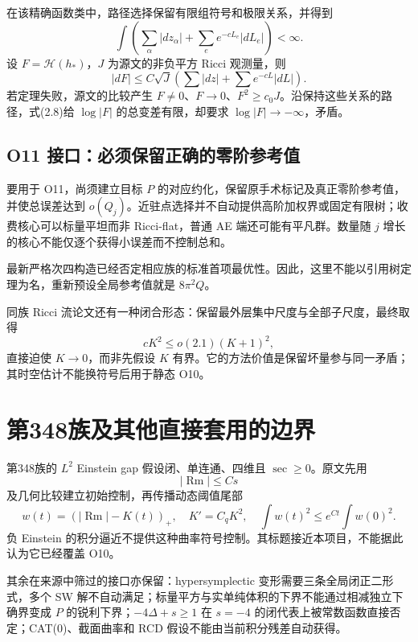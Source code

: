 \documentclass[UTF8,11pt,openany,fontset=none]{ctexbook}
\theoremstyle{definition}
\theoremstyle{remark}
\begin{document}
在该精确函数类中，路径选择保留有限组符号和极限关系，并得到 \[
 \int\left(\sum_\alpha|dz_\alpha|+
 \sum_e e^{-cL_e}|dL_e|\right)<\infty.
\tag{2.7}
\] 设 \(F=\mathscr H(h_*)\)，\(J\) 为源文的非负平方 Ricci 观测量，则 \[
 |dF|\le C\sqrt J\left(\sum|dz|+\sum e^{-cL}|dL|\right).
\tag{2.8}
\] 若定理失败，源文的比较产生 \(F\ne0\)、\(F\to0\)、\(F^2\ge c_0J\)。沿保持这些关系的路径，式(2.8)给 \(\log|F|\) 的总变差有限，却要求 \(\log|F|\to-\infty\)，矛盾。

\subsection{O11 接口：必须保留正确的零阶参考值}\label{v2-o11-ux63a5ux53e3ux5fc5ux987bux4fddux7559ux6b63ux786eux7684ux96f6ux9636ux53c2ux8003ux503c}

要用于 O11，尚须建立目标 \(P\) 的对应约化，保留原手术标记及真正零阶参考值，并使总误差达到 \(o(Q_j)\)。近驻点选择并不自动提供高阶加权界或固定有限树；收费核心可以标量平坦而非 Ricci-flat，普通 AE 端还可能有平凡群。数量随 \(j\) 增长的核心不能仅逐个获得小误差而不控制总和。

最新严格次四构造已经否定相应族的标准首项最优性。因此，这里不能以引用树定理为名，重新预设全局参考值就是 \(8\pi^2Q\)。

同族 Ricci 流论文还有一种闭合形态：保留最外层集中尺度与全部子尺度，最终取得 \[
 cK^2\le o(2.1)(K+1)^2,
\] 直接迫使 \(K\to0\)，而非先假设 \(K\) 有界。它的方法价值是保留坏量参与同一矛盾；其时空估计不能换符号后用于静态 O10。\cite{R01,R02}

\section{第348族及其他直接套用的边界}\label{v2-ux7b2c348ux65cfux53caux5176ux4ed6ux76f4ux63a5ux5957ux7528ux7684ux8fb9ux754c}

第348族的 \(L^2\) Einstein gap 假设闭、单连通、四维且 \(\sec\ge0\)。原文先用 \[
 |\operatorname{Rm}|\le Cs
\] 及几何比较建立初始控制，再传播动态阈值尾部 \[
 w(t)=(|\operatorname{Rm}|-K(t))_+,
 \quad K'=C_qK^2,
 \quad\int w(t)^2\le e^{Ct}\int w(0)^2.
\] 负 Einstein 的积分逼近不提供这种曲率符号控制。其标题接近本项目，不能据此认为它已经覆盖 O10。\cite{OAI348,R01}

其余在来源中筛过的接口亦保留：hypersymplectic 变形需要三条全局闭正二形式，多个 SW 解不自动满足；标量平方与实单纯体积的下界不能通过相减独立下确界变成 \(P\) 的锐利下界；\(-4\Delta+s\ge1\) 在 \(s=-4\) 的闭代表上被常数函数直接否定；CAT(0)、截面曲率和 RCD 假设不能由当前积分残差自动获得。
\end{document}
